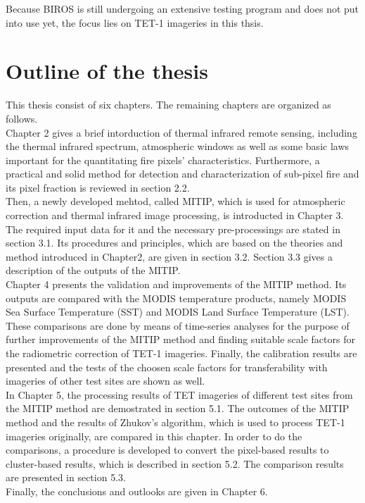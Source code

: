 \noindent Because BIROS is still undergoing an extensive testing program and does not put into use yet, the focus lies on TET-1 imageries in this thsis.\\ 


\section{Outline of the thesis}
This thesis consist of six chapters. The remaining chapters are organized as follows.\\

\noindent Chapter 2 gives a brief intorduction of thermal infrared remote sensing, including the thermal infrared spectrum, atmospheric windows as well as some basic laws important for the quantitating fire pixels' characteristics. Furthermore, a practical and solid method for detection and characterization of sub-pixel fire and its pixel fraction is reviewed in section 2.2.\\

\noindent Then, a newly developed mehtod, called MITIP, which is used for atmospheric correction and thermal infrared image processing, is introducted in Chapter 3. The required input data for it and the necessary pre-processings are stated in section 3.1. Its procedures and principles, which are based on the theories and method introduced in Chapter2, are given in section 3.2. Section 3.3 gives a description of the outputs of the MITIP.\\

\noindent Chapter 4 presents the validation and improvements of the MITIP method. Its outputs are compared with the MODIS temperature products, namely MODIS Sea Surface Temperature (SST) and MODIS Land Surface Temperature (LST). These comparisons are done by means of time-series analyses for the purpose of further improvements of the MITIP method and finding suitable scale factors for the radiometric correction of TET-1 imageries. Finally, the calibration results are presented and the tests of the choosen scale factors for transferability with imageries of other test sites are shown as well.\\

\noindent In Chapter 5, the processing results of TET imageries of different test sites from the MITIP method are demostrated in section 5.1. The outcomes of the MITIP method and the results of Zhukov's algorithm, which is used to process TET-1 imageries originally, are compared in this chapter. In order to do the comparisons, a procedure is developed to convert the pixel-based results to cluster-based results, which is described in section 5.2. The comparison results are presented in section 5.3.\\

\noindent Finally, the conclusions and outlooks are given in Chapter 6.\\
